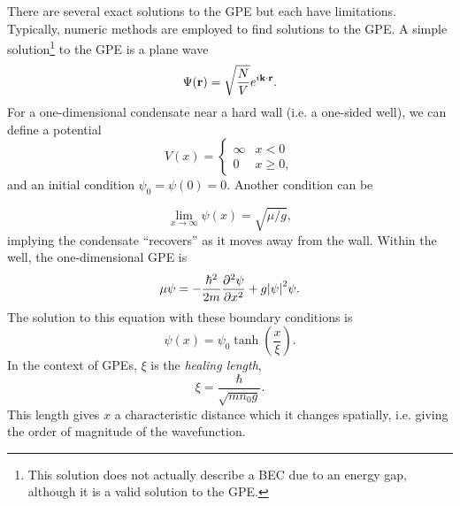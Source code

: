 \documentclass{homework}
\begin{document}
	There are several exact solutions to the GPE but each have limitations. Typically, numeric methods are employed to find solutions to the GPE. A simple solution\footnote{This solution does not actually describe a BEC due to an energy gap, although it is a valid solution to the GPE.} to the GPE is a plane wave $$\Psi(\boldsymbol{\mathrm{r}}) = \sqrt{\frac{N}{V}}e^{i\boldsymbol{\mathrm{k}} \cdot \boldsymbol{\mathrm{r}}}.$$
	For a one-dimensional condensate near a hard wall (i.e. a one-sided well), we can define a potential $$V(x) = \begin{cases}
		\infty & x < 0 \\
		0 & x \ge 0,
	\end{cases}$$
	and an initial condition $\psi_0 = \psi(0) = 0$. Another condition can be
	
	$$\lim_{x \to \infty} \psi(x) = \sqrt{\mu / g},$$
	implying the condensate ``recovers'' as it moves away from the wall. Within the well, the one-dimensional GPE is
	$$\mu \psi = -\frac{\hbar^2}{2m} \pdv[2]{\psi}{x} + g\abs{\psi}^2 \psi.$$ The solution to this equation with these boundary conditions is
	$$\psi(x) = \psi_0 \tanh(\frac{x}{\xi}).$$
	In the context of GPEs, $\xi$ is the \textit{healing length}, $$\xi = \frac{\hbar}{\sqrt{mn_0 g}}.$$ This length gives $x$ a characteristic distance which it changes spatially, i.e. giving the order of magnitude of the wavefunction. 
%	
%	
%	
\end{document}
